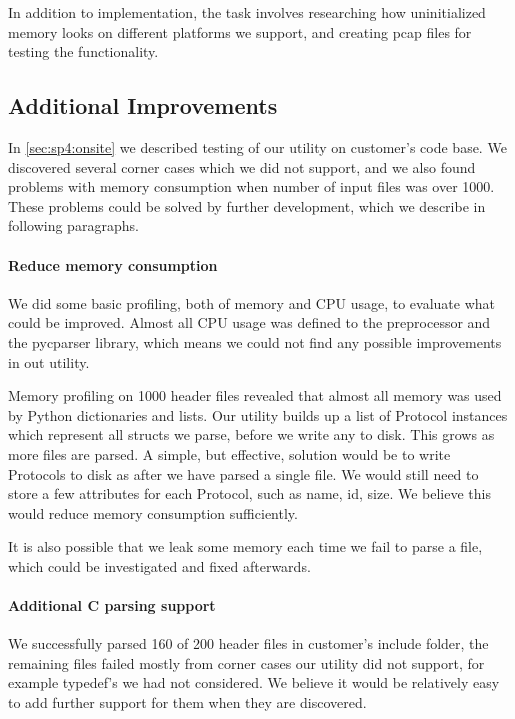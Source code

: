 In addition to implementation, the task involves researching how uninitialized memory looks on different platforms we support, and creating pcap files for testing the functionality.

\subsection{Additional Improvements}
\label{sec:conc:addimps}
In \autoref{sec:sp4:onsite} we described testing of our utility on customer's
code base. We discovered several corner cases which we did not support, and we
also found problems with memory consumption when number of input files was
over 1000. These problems could be solved by further development, which we
describe in following paragraphs.

\paragraph{Reduce memory consumption}
We did some basic profiling, both of memory and CPU usage, to evaluate what
could be improved. Almost all CPU usage was defined to the preprocessor and
the pycparser library, which means we could not find any possible improvements
in out utility.

Memory profiling on 1000 header files revealed that almost all memory was used
by Python dictionaries and lists. Our utility builds up a list of Protocol
instances which represent all structs we parse, before we write any to disk.
This grows as more files are parsed. A simple, but effective, solution would
be to write Protocols to disk as after we have parsed a single file. We would
still need to store a few attributes for each Protocol, such as name, id,
size. We believe this would reduce memory consumption sufficiently.

It is also possible that we leak some memory each time we fail to parse a
file, which could be investigated and fixed afterwards.

\paragraph{Additional C parsing support}
We successfully parsed 160 of 200 header files in customer's include folder,
the remaining files failed mostly from corner cases our utility did not
support, for example typedef's we had not considered. We believe it would be
relatively easy to add further support for them when they are discovered.

